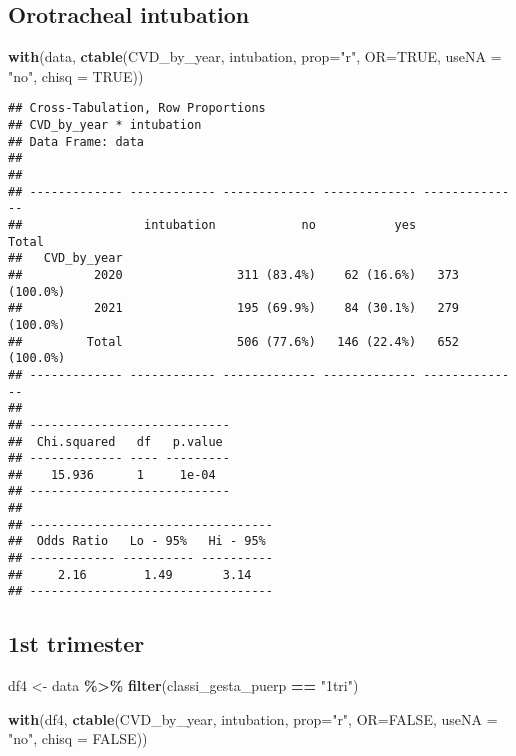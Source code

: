 \documentclass[
]{article}
\newenvironment{Shaded}{\begin{snugshade}}{\end{snugshade}}
\newcommand{\AttributeTok}[1]{\textcolor[rgb]{0.13,0.29,0.53}{#1}}
\newcommand{\ConstantTok}[1]{\textcolor[rgb]{0.56,0.35,0.01}{#1}}
\newcommand{\FunctionTok}[1]{\textcolor[rgb]{0.13,0.29,0.53}{\textbf{#1}}}
\newcommand{\NormalTok}[1]{#1}
\newcommand{\OtherTok}[1]{\textcolor[rgb]{0.56,0.35,0.01}{#1}}
\newcommand{\SpecialCharTok}[1]{\textcolor[rgb]{0.81,0.36,0.00}{\textbf{#1}}}
\newcommand{\StringTok}[1]{\textcolor[rgb]{0.31,0.60,0.02}{#1}}
\begin{document}
\hypertarget{orotracheal-intubation}{%
\subsection{Orotracheal intubation}\label{orotracheal-intubation}}

\begin{Shaded}
\begin{Highlighting}[]
\FunctionTok{with}\NormalTok{(data, }\FunctionTok{ctable}\NormalTok{(CVD\_by\_year, intubation, }\AttributeTok{prop=}\StringTok{"r"}\NormalTok{, }\AttributeTok{OR=}\ConstantTok{TRUE}\NormalTok{, }\AttributeTok{useNA =} \StringTok{"no"}\NormalTok{, }\AttributeTok{chisq =} \ConstantTok{TRUE}\NormalTok{))}
\end{Highlighting}
\end{Shaded}

\begin{verbatim}
## Cross-Tabulation, Row Proportions  
## CVD_by_year * intubation  
## Data Frame: data  
## 
## 
## ------------- ------------ ------------- ------------- --------------
##                 intubation            no           yes          Total
##   CVD_by_year                                                        
##          2020                311 (83.4%)    62 (16.6%)   373 (100.0%)
##          2021                195 (69.9%)    84 (30.1%)   279 (100.0%)
##         Total                506 (77.6%)   146 (22.4%)   652 (100.0%)
## ------------- ------------ ------------- ------------- --------------
## 
## ----------------------------
##  Chi.squared   df   p.value 
## ------------- ---- ---------
##    15.936      1     1e-04  
## ----------------------------
## 
## ----------------------------------
##  Odds Ratio   Lo - 95%   Hi - 95% 
## ------------ ---------- ----------
##     2.16        1.49       3.14   
## ----------------------------------
\end{verbatim}

\hypertarget{st-trimester-7}{%
\subsection{1st trimester}\label{st-trimester-7}}

\begin{Shaded}
\begin{Highlighting}[]
\NormalTok{df4 }\OtherTok{\textless{}{-}}\NormalTok{ data }\SpecialCharTok{\%\textgreater{}\%} 
  \FunctionTok{filter}\NormalTok{(classi\_gesta\_puerp }\SpecialCharTok{==} \StringTok{"1tri"}\NormalTok{)}

\FunctionTok{with}\NormalTok{(df4, }\FunctionTok{ctable}\NormalTok{(CVD\_by\_year, intubation, }\AttributeTok{prop=}\StringTok{"r"}\NormalTok{, }\AttributeTok{OR=}\ConstantTok{FALSE}\NormalTok{, }\AttributeTok{useNA =} \StringTok{"no"}\NormalTok{, }\AttributeTok{chisq =} \ConstantTok{FALSE}\NormalTok{))}
\end{Highlighting}
\end{Shaded}
\end{document}
